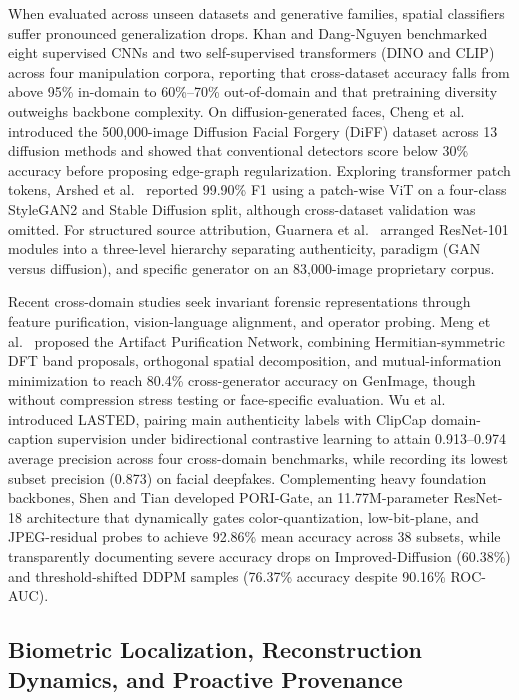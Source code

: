 \documentclass[final,5p,times,twocolumn,numafflabel]{elsarticle}
\begin{document}
When evaluated across unseen datasets and generative families, spatial classifiers suffer pronounced generalization drops. Khan and Dang-Nguyen \cite{Khan_2024} benchmarked eight supervised CNNs and two self-supervised transformers (DINO and CLIP) across four manipulation corpora, reporting that cross-dataset accuracy falls from above 95\% in-domain to 60\%--70\% out-of-domain and that pretraining diversity outweighs backbone complexity. On diffusion-generated faces, Cheng et al.\ \cite{Cheng_2024} introduced the 500,000-image Diffusion Facial Forgery (DiFF) dataset across 13 diffusion methods and showed that conventional detectors score below 30\% accuracy before proposing edge-graph regularization. Exploring transformer patch tokens, Arshed et al.\ \cite{Arshed_2024} reported 99.90\% F1 using a patch-wise ViT on a four-class StyleGAN2 and Stable Diffusion split, although cross-dataset validation was omitted. For structured source attribution, Guarnera et al.\ \cite{Guarnera_2024} arranged ResNet-101 modules into a three-level hierarchy separating authenticity, paradigm (GAN versus diffusion), and specific generator on an 83,000-image proprietary corpus.

Recent cross-domain studies seek invariant forensic representations through feature purification, vision-language alignment, and operator probing. Meng et al.\ \cite{Meng_2024} proposed the Artifact Purification Network, combining Hermitian-symmetric DFT band proposals, orthogonal spatial decomposition, and mutual-information minimization to reach 80.4\% cross-generator accuracy on GenImage, though without compression stress testing or face-specific evaluation. Wu et al.\ \cite{Wu_2026} introduced LASTED, pairing main authenticity labels with ClipCap domain-caption supervision under bidirectional contrastive learning to attain 0.913--0.974 average precision across four cross-domain benchmarks, while recording its lowest subset precision (0.873) on facial deepfakes. Complementing heavy foundation backbones, Shen and Tian \cite{Shen_2026} developed PORI-Gate, an 11.77M-parameter ResNet-18 architecture that dynamically gates color-quantization, low-bit-plane, and JPEG-residual probes to achieve 92.86\% mean accuracy across 38 subsets, while transparently documenting severe accuracy drops on Improved-Diffusion (60.38\%) and threshold-shifted DDPM samples (76.37\% accuracy despite 90.16\% ROC-AUC).

\subsection{Biometric Localization, Reconstruction Dynamics, and Proactive Provenance}
\end{document}
